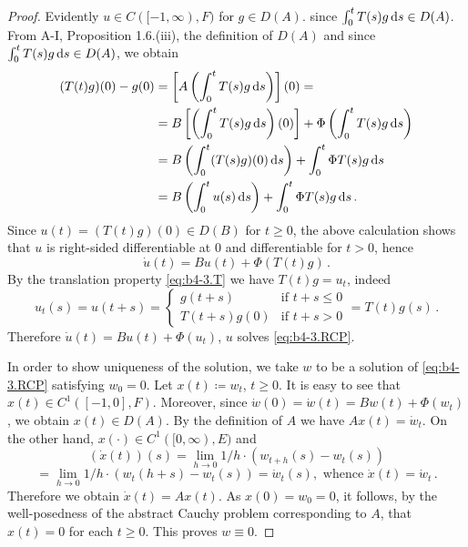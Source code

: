 \begin{proof} Evidently $u \in C([-1,\infty),F)$ for $g \in D(A)$.
since $\int_{0}^{t} T(s)g \mathop{}\!\mathrm{d}{s}  \in D(A)$.
From A-I, Proposition 1.6.(iii), the definition of $D(A)$ and since $\int_{0}^{t} T(s)g \mathop{}\!\mathrm{d}{s}  \in D(A)$, we obtain
\begin{align*}
	(T(t)g)(0) - g(0) &= \left[A\left(\int_{0}^{t} T(s)g  \mathop{}\!\mathrm{d}{s} \right)\right](0) = \\
	&= B\left[\left(\int_{0}^{t} T(s)g \mathop{}\!\mathrm{d}{s}\right)(0)\right] + \Phi\left(\int_{0}^{t} T(s)g \mathop{}\!\mathrm{d}{s} \right) \\
	&= B\left(\int_{0}^{t} (T(s)g)(0) \mathop{}\!\mathrm{d}{s}\right) + \int_{0}^{t} \Phi T(s)g \mathop{}\!\mathrm{d}{s}  \\
	&= B\left(\int_{0}^{t} u(s) \mathop{}\!\mathrm{d}{s}\right)  + \int_{0}^{t} \Phi T(s)g \mathop{}\!\mathrm{d}{s}\,.
\end{align*}
Since $u(t) = (T(t)g)(0) \in D(B)$ for $t \geq 0$, the above calculation shows that $u$ is right-sided differentiable at $0$ and differentiable for $t > 0$, hence
\[
\dot{u}(t) = Bu(t) + \Phi(T(t)g)\,.
\]
By the translation property \eqref{eq:b4-3.T} we have $T(t)g = u_t$, indeed
\[
u_t(s) = u(t+s) = 
\begin{cases}
	g(t+s) & \text{if } t+s \leq 0 \\
	T(t+s)g(0) & \text{if } t+s > 0
\end{cases}
= T(t)g(s)\,.
\]
Therefore $\dot{u}(t) = Bu(t) + \Phi(u_t)$, \ie $u$ solves \eqref{eq:b4-3.RCP}.

In order to show uniqueness of the solution, we take $w$ to be a solution of \eqref{eq:b4-3.RCP} satisfying $w_{0} = 0$. 
Let $x(t) \coloneq  w_t$, $t \geq 0$. 
It is easy to see that $x(t) \in C^1([-1,0],F)$. Moreover, since $\dot{w}(0) = \dot{w}(t) = Bw(t) + \Phi(w_t)$, we obtain $x(t) \in D(A)$. 
By the definition of $A$ we have $Ax(t) = \dot{w}_t$. 
On the other hand, $x(\cdot) \in C^1([0,\infty),E)$ and
\[
(\dot{x}(t))(s) = \lim_{h \to 0} 1/h \cdot (w_{t+h}(s) - w_t(s))
\]
\[
= \lim_{h \to 0} 1/h \cdot (w_t(h+s) - w_t(s)) = \dot{w}_t(s), \text{ whence } \dot{x}(t) = \dot{w}_t\,.
\]
Therefore we obtain $\dot{x}(t) = Ax(t)$. 
As $x(0) = w_{0} = 0$, it follows, by the well-posedness of the abstract Cauchy problem corresponding to $A$,  that $x(t) = 0$ for each $t \geq 0$. 
This proves $w \equiv 0$.
\end{proof}
